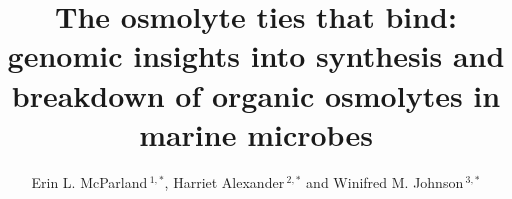 \documentclass[utf8]{frontiersSCNS} %
\def\firstAuthorLast{McParland {et~al.}} %
\def\Authors{Erin L. McParland\,$^{1,*}$, Harriet Alexander\,$^{2, *}$ and Winifred M. Johnson\,$^{3, *}$}
\begin{document}
\onecolumn
{}

\title[Marine osmolytes]{The osmolyte ties that bind: genomic insights into synthesis and breakdown of organic osmolytes in marine microbes} 

\author[\firstAuthorLast ]{\Authors} %
\address{} %
\correspondance{} %



\maketitle
\end{document}
